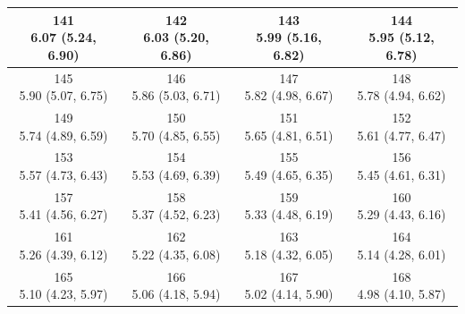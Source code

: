 \begin{table}[htbp]
\begin{tabular}{cccc}
\shortstack[c]{141\\6.07 (5.24, 6.90)} & \shortstack[c]{142\\6.03 (5.20, 6.86)} & \shortstack[c]{143\\5.99 (5.16, 6.82)} & \shortstack[c]{144\\5.95 (5.12, 6.78)} \\
\hline
\shortstack[c]{145\\5.90 (5.07, 6.75)} & \shortstack[c]{146\\5.86 (5.03, 6.71)} & \shortstack[c]{147\\5.82 (4.98, 6.67)} & \shortstack[c]{148\\5.78 (4.94, 6.62)} \\
\hline
\shortstack[c]{149\\5.74 (4.89, 6.59)} & \shortstack[c]{150\\5.70 (4.85, 6.55)} & \shortstack[c]{151\\5.65 (4.81, 6.51)} & \shortstack[c]{152\\5.61 (4.77, 6.47)} \\
\hline
\shortstack[c]{153\\5.57 (4.73, 6.43)} & \shortstack[c]{154\\5.53 (4.69, 6.39)} & \shortstack[c]{155\\5.49 (4.65, 6.35)} & \shortstack[c]{156\\5.45 (4.61, 6.31)} \\
\hline
\shortstack[c]{157\\5.41 (4.56, 6.27)} & \shortstack[c]{158\\5.37 (4.52, 6.23)} & \shortstack[c]{159\\5.33 (4.48, 6.19)} & \shortstack[c]{160\\5.29 (4.43, 6.16)} \\
\hline
\shortstack[c]{161\\5.26 (4.39, 6.12)} & \shortstack[c]{162\\5.22 (4.35, 6.08)} & \shortstack[c]{163\\5.18 (4.32, 6.05)} & \shortstack[c]{164\\5.14 (4.28, 6.01)} \\
\hline
\shortstack[c]{165\\5.10 (4.23, 5.97)} & \shortstack[c]{166\\5.06 (4.18, 5.94)} & \shortstack[c]{167\\5.02 (4.14, 5.90)} & \shortstack[c]{168\\4.98 (4.10, 5.87)} \\
\hline

\end{tabular}
\end{table}
